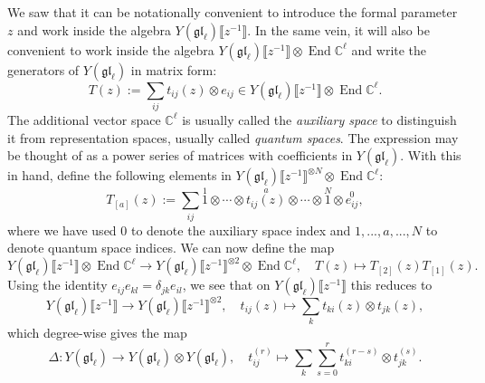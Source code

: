 \documentclass[11pt]{report}
\theoremstyle{definition}
\theoremstyle{remark}
\theoremstyle{remark}
\newcommand{\End}{\operatorname{End}}
\newcommand{\C}{\mathbb{C}}
\begin{document}
We saw that it can be notationally convenient to introduce the formal parameter $z$ and work inside the algebra $Y(\mathfrak{gl}_\ell)\llbracket z^{-1} \rrbracket$. In the same vein, it will also be convenient to work inside the algebra $Y(\mathfrak{gl}_\ell)\llbracket z^{-1} \rrbracket \otimes \End \C^\ell$ and write the generators of $Y(\mathfrak{gl}_\ell)$ in matrix form:
\begin{equation*}
T(z) := \sum_{ij} t_{ij}(z) \otimes e_{ij} \in Y(\mathfrak{gl}_\ell)\llbracket z^{-1} \rrbracket \otimes \End \C^\ell.
\end{equation*}
The additional vector space $\C^\ell$ is usually called the \emph{auxiliary space} to distinguish it from representation spaces, usually called \emph{quantum spaces}. The expression may be thought of as a power series of matrices with coefficients in $Y(\mathfrak{gl}_\ell)$. With this in hand, define the following elements in $Y(\mathfrak{gl}_\ell)\llbracket z^{-1} \rrbracket^{\otimes N} \otimes \End \C^\ell$:
\begin{equation*}
T_{[a]}(z) := \sum_{ij} \overset{1}{1} \otimes \cdots \otimes \overset{a}{t_{ij}(z)} \otimes \cdots \otimes \overset{N}{1} \otimes \overset{0}{e_{ij}},
\end{equation*}
where we have used $0$ to denote the auxiliary space index and $1,...,a,...,N$ to denote quantum space indices. We can now define the map
\begin{equation*}
Y(\mathfrak{gl}_\ell)\llbracket z^{-1} \rrbracket \otimes \End \C^\ell \to Y(\mathfrak{gl}_\ell)\llbracket z^{-1} \rrbracket^{\otimes 2} \otimes \End \C^\ell, \quad T(z) \mapsto T_{[2]}(z) T_{[1]}(z).
\end{equation*}
Using the identity $e_{ij} e_{kl} = \delta_{jk} e_{il}$, we see that on $Y(\mathfrak{gl}_\ell)\llbracket z^{-1} \rrbracket$ this reduces to
\begin{equation*}
Y(\mathfrak{gl}_\ell)\llbracket z^{-1} \rrbracket \to Y(\mathfrak{gl}_\ell)\llbracket z^{-1} \rrbracket^{\otimes 2}, \quad t_{ij}(z) \mapsto \sum_k t_{ki}(z) \otimes t_{jk}(z),
\end{equation*}
which degree-wise gives the map
\begin{equation}\label{equation:coproduct}
\Delta: Y(\mathfrak{gl}_\ell) \to Y(\mathfrak{gl}_\ell) \otimes Y(\mathfrak{gl}_\ell), \quad t_{ij}^{(r)} \mapsto \sum_k \sum_{s=0}^r t_{ki}^{(r-s)} \otimes t_{jk}^{(s)}.
\end{equation}
\end{document}
